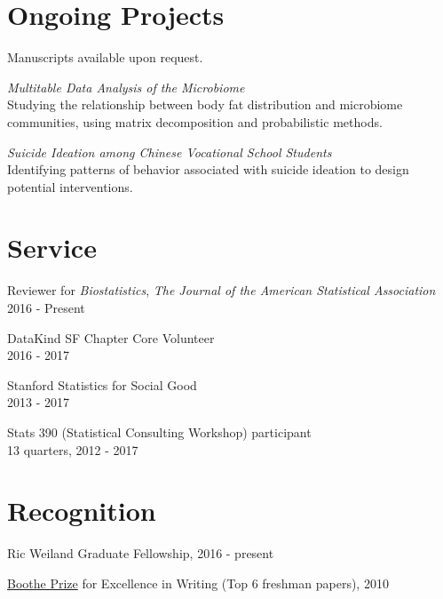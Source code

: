 \documentclass[letterpaper]{article}
\def\footerlink{}
\renewenvironment{itemize}{
  \begin{list}{}{
    \setlength{\leftmargin}{1.5em}
  }
}{
  \end{list}
}
\begin{document}
\section*{Ongoing Projects}
Manuscripts available upon request.
\begin{itemize}
  \item \textit{Multitable Data Analysis of the Microbiome} \\
    Studying the relationship between body fat distribution and microbiome
    communities, using matrix decomposition and probabilistic methods.
  \item \textit{Suicide Ideation among Chinese Vocational School Students} \\
    Identifying patterns of behavior associated with suicide ideation to design
    potential interventions.
\end{itemize}

\section*{Service}

\begin{itemize}
\item Reviewer for \textit{Biostatistics}, \textit{The Journal of the American Statistical Association} \\
  2016 - Present
\item DataKind SF Chapter Core Volunteer \\
  2016 - 2017
\item Stanford Statistics for Social Good \\
  2013 - 2017
\item Stats 390 (Statistical Consulting Workshop) participant \\
  13 quarters, 2012 - 2017
\end{itemize}

\section*{Recognition}
\begin{itemize}
\item Ric Weiland Graduate Fellowship, 2016 - present
\item \href{https://undergrad.stanford.edu/programs/pwr/publications-prizes-and-awards/boothe-prize-essays}{Boothe Prize} for Excellence in Writing (Top 6 freshman papers), 2010
\end{itemize}

\end{document}
